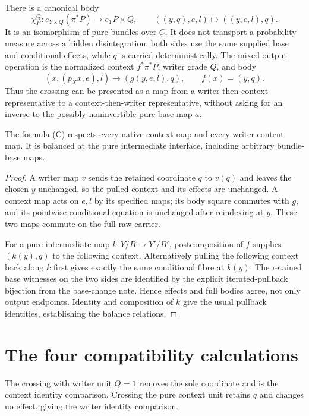 \documentclass[11pt]{article}
\begin{document}
There is a canonical body
\[
 \chi_P^Q:e_{Y\times Q}(\pi^*P)\longrightarrow e_YP\times Q,
 \qquad ((y,q),e,l)\longmapsto((y,e,l),q).
\tag{W}
\]
It is an isomorphism of pure bundles over $C$. It does not transport a probability measure across a hidden disintegration: both sides use the same supplied base and conditional effects, while $q$ is carried deterministically. The mixed output operation is the normalized context $f^*\pi^*P$, writer grade $Q$, and body
\[
 (x,(p_Xx,e),l)\longmapsto(g(y,e,l),q),\qquad f(x)=(y,q).
\tag{C}
\]
Thus the crossing can be presented as a map from a writer-then-context representative to a context-then-writer representative, without asking for an inverse to the possibly noninvertible pure base map $a$.

\begin{proposition}
The formula (C) respects every native context map and every writer content map. It is balanced at the pure intermediate interface, including arbitrary bundle-base maps.
\end{proposition}
\begin{proof}
A writer map $v$ sends the retained coordinate $q$ to $v(q)$ and leaves the chosen $y$ unchanged, so the pulled context and its effects are unchanged. A context map acts on $e,l$ by its specified maps; its body square commutes with $g$, and its pointwise conditional equation is unchanged after reindexing at $y$. These two maps commute on the full raw carrier.

For a pure intermediate map $k:Y/B\to Y'/B'$, postcomposition of $f$ supplies $(k(y),q)$ to the following context. Alternatively pulling the following context back along $k$ first gives exactly the same conditional fibre at $k(y)$. The retained base witnesses on the two sides are identified by the explicit iterated-pullback bijection from the base-change note. Hence effects and full bodies agree, not only output endpoints. Identity and composition of $k$ give the usual pullback identities, establishing the balance relations.
\end{proof}

\section{The four compatibility calculations}
The crossing with writer unit $Q=1$ removes the sole coordinate and is the context identity comparison. Crossing the pure context unit retains $q$ and changes no effect, giving the writer identity comparison.
\end{document}
